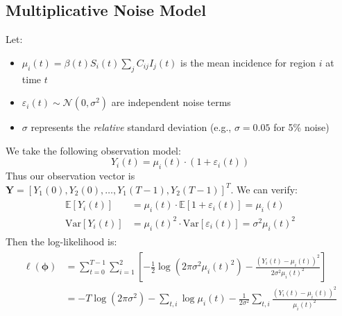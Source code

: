 


\subsection{Multiplicative Noise Model}
Let:
\begin{itemize}
\item $\mu_i(t) = \beta(t) S_i(t) \sum_j C_{ij} I_j(t)$ is the mean
  incidence for region $i$ at time $t$
\item $\varepsilon_i(t) \sim \mathcal{N}(0, \sigma^2)$ are independent
  noise terms
\item $\sigma$ represents the \emph{relative} standard deviation
  (e.g., $\sigma = 0.05$ for 5\% noise)
\end{itemize}
We take the following observation model:
\begin{equation}
Y_i(t) = \mu_i(t) \cdot (1 + \varepsilon_i(t))
\end{equation}
Thus our observation vector is $\mathbf{Y} = [Y_1(0), Y_2(0),
  \ldots, Y_1(T-1), Y_2(T-1)]^T$. We can verify:
\begin{align}\label{eq:moments}
  \begin{split}
    \mathbb{E}[Y_i(t)] &= \mu_i(t) \cdot \mathbb{E}[1 + \varepsilon_i(t)] = \mu_i(t) \\
    \text{Var}[Y_i(t)] &= \mu_i(t)^2 \cdot \text{Var}[\varepsilon_i(t)] = \sigma^2 \mu_i(t)^2
  \end{split}
\end{align}
Then the log-likelihood is:
\begin{align}\begin{split}
\ell(\boldsymbol{\phi}) &= \sum_{t=0}^{T-1} \sum_{i=1}^{2} \left[ -\frac{1}{2}\log(2\pi\sigma^2\mu_i(t)^2) - \frac{(Y_i(t) - \mu_i(t))^2}{2\sigma^2 \mu_i(t)^2} \right] \\
&= -T\log(2\pi\sigma^2) - \sum_{t,i} \log\mu_i(t) - \frac{1}{2\sigma^2}\sum_{t,i} \frac{(Y_i(t) - \mu_i(t))^2}{\mu_i(t)^2}
\end{split}\end{align}

